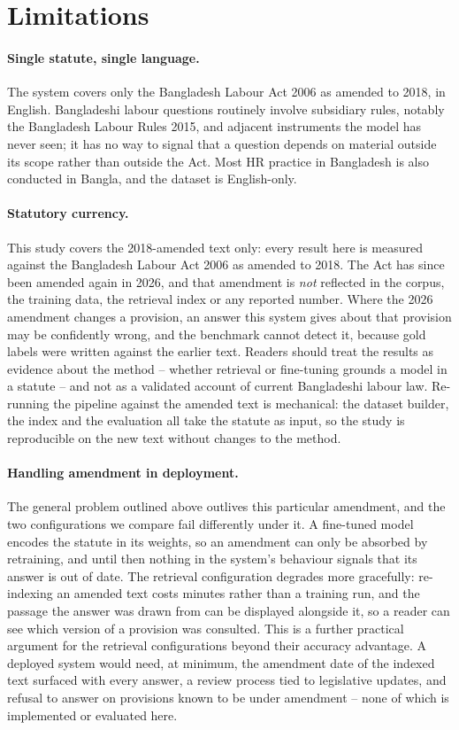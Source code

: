 \documentclass[11pt,a4paper]{article}
\begin{document}
\section{Limitations}
\paragraph{Single statute, single language.} The system covers only the Bangladesh Labour Act 2006 as amended to 2018, in English. Bangladeshi labour questions routinely involve subsidiary rules, notably the Bangladesh Labour Rules 2015, and adjacent instruments the model has never seen; it has no way to signal that a question depends on material outside its scope rather than outside the Act. Most HR practice in Bangladesh is also conducted in Bangla, and the dataset is English-only.

\paragraph{Statutory currency.} This study covers the 2018-amended text only: every result here is measured against the Bangladesh Labour Act 2006 as amended to 2018. The Act has since been amended again in 2026, and that amendment is \emph{not} reflected in the corpus, the training data, the retrieval index or any reported number. Where the 2026 amendment changes a provision, an answer this system gives about that provision may be confidently wrong, and the benchmark cannot detect it, because gold labels were written against the earlier text. Readers should treat the results as evidence about the method -- whether retrieval or fine-tuning grounds a model in a statute -- and not as a validated account of current Bangladeshi labour law. Re-running the pipeline against the amended text is mechanical: the dataset builder, the index and the evaluation all take the statute as input, so the study is reproducible on the new text without changes to the method.

\paragraph{Handling amendment in deployment.} The general problem outlined above outlives this particular amendment, and the two configurations we compare fail differently under it. A fine-tuned model encodes the statute in its weights, so an amendment can only be absorbed by retraining, and until then nothing in the system's behaviour signals that its answer is out of date. The retrieval configuration degrades more gracefully: re-indexing an amended text costs minutes rather than a training run, and the passage the answer was drawn from can be displayed alongside it, so a reader can see which version of a provision was consulted. This is a further practical argument for the retrieval configurations beyond their accuracy advantage. A deployed system would need, at minimum, the amendment date of the indexed text surfaced with every answer, a review process tied to legislative updates, and refusal to answer on provisions known to be under amendment -- none of which is implemented or evaluated here.
\end{document}

